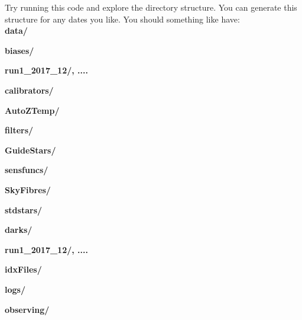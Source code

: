 \documentclass[12pt]{article}
\begin{document}
Try running this code and explore the directory structure. You can generate this structure for any dates you like. You should something like have:\\

\hspace{5mm} \textbf{data/} 
\vspace{1mm}

\hspace{10mm} \textbf{biases/}
\vspace{1mm}

\hspace{15mm} \textbf{run1\_2017\_12/, ....} 
\vspace{1mm}

\hspace{10mm} \textbf{calibrators/} 
\vspace{1mm}

\hspace{15mm} \textbf{AutoZTemp/} 
\vspace{1mm}

\hspace{15mm} \textbf{filters/} 
\vspace{1mm}

\hspace{15mm} \textbf{GuideStars/}
\vspace{1mm}

\hspace{15mm} \textbf{sensfuncs/}
\vspace{1mm}

\hspace{15mm} \textbf{SkyFibres/}
\vspace{1mm}

\hspace{15mm} \textbf{stdstars/}
\vspace{1mm}

\hspace{10mm} \textbf{darks/} 
\vspace{1mm}

\hspace{15mm} \textbf{run1\_2017\_12/, ....}
\vspace{1mm}

\hspace{10mm} \textbf{idxFiles/} 
\vspace{1mm}

\hspace{10mm} \textbf{logs/} 
\vspace{1mm}

\hspace{10mm} \textbf{observing/} 
\vspace{1mm}
\end{document}
